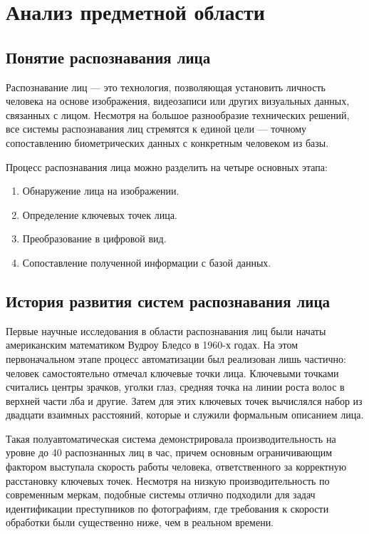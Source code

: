 \section{Анализ предметной области}
\subsection{Понятие распознавания лица}

Распознавание лиц — это технология, позволяющая установить личность человека на основе изображения, видеозаписи или других визуальных данных, связанных с лицом. Несмотря на большое разнообразие технических решений, все системы распознавания лиц стремятся к единой цели — точному сопоставлению биометрических данных с конкретным человеком из базы\cite{sis}.

Процесс распознавания лица можно разделить на четыре основных этапа:

\begin{enumerate}
	\item Обнаружение лица на изображении.
	\item Определение ключевых точек лица.
	\item Преобразование в цифровой вид.
	\item Сопоставление полученной информации с базой данных.
\end{enumerate}

\subsection{История развития систем распознавания лица}

Первые научные исследования в области распознавания лиц были начаты американским математиком Вудроу Бледсо в 1960-х годах. На этом первоначальном этапе процесс автоматизации был реализован лишь частично: человек самостоятельно отмечал ключевые точки лица. Ключевыми точками считались центры зрачков, уголки глаз, средняя точка на линии роста волос в верхней части лба и другие. Затем для этих ключевых точек вычислялся набор из двадцати взаимных расстояний, которые и служили формальным описанием лица.

Такая полуавтоматическая система демонстрировала производительность на уровне до 40 распознанных лиц в час, причем основным ограничивающим фактором выступала скорость работы человека, ответственного за корректную расстановку ключевых точек. Несмотря на низкую производительность по современным меркам, подобные системы отлично подходили для задач идентификации преступников по фотографиям, где требования к скорости обработки были существенно ниже, чем в реальном времени.

